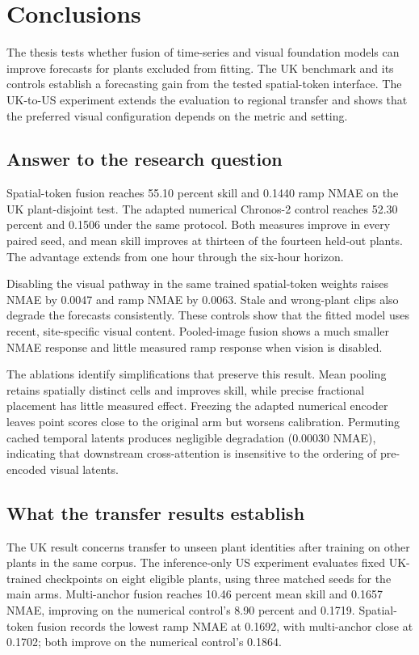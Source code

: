\chapter{Conclusions}
\label{cha:conclusions}

The thesis tests whether fusion of time-series and visual foundation models can improve forecasts for plants excluded from fitting. The UK benchmark and its controls establish a forecasting gain from the tested spatial-token interface. The UK-to-US experiment extends the evaluation to regional transfer and shows that the preferred visual configuration depends on the metric and setting.

\section{Answer to the research question}

Spatial-token fusion reaches 55.10 percent skill and 0.1440 ramp NMAE on the UK plant-disjoint test. The adapted numerical Chronos-2 control reaches 52.30 percent and 0.1506 under the same protocol. Both measures improve in every paired seed, and mean skill improves at thirteen of the fourteen held-out plants. The advantage extends from one hour through the six-hour horizon.

Disabling the visual pathway in the same trained spatial-token weights raises NMAE by 0.0047 and ramp NMAE by 0.0063. Stale and wrong-plant clips also degrade the forecasts consistently. These controls show that the fitted model uses recent, site-specific visual content. Pooled-image fusion shows a much smaller NMAE response and little measured ramp response when vision is disabled.

The ablations identify simplifications that preserve this result. Mean pooling retains spatially distinct cells and improves skill, while precise fractional placement has little measured effect. Freezing the adapted numerical encoder leaves point scores close to the original arm but worsens calibration. Permuting cached temporal latents produces negligible degradation (0.00030 NMAE), indicating that downstream cross-attention is insensitive to the ordering of pre-encoded visual latents.

\section{What the transfer results establish}

The UK result concerns transfer to unseen plant identities after training on other plants in the same corpus. The inference-only US experiment evaluates fixed UK-trained checkpoints on eight eligible plants, using three matched seeds for the main arms. Multi-anchor fusion reaches 10.46 percent mean skill and 0.1657 NMAE, improving on the numerical control's 8.90 percent and 0.1719. Spatial-token fusion records the lowest ramp NMAE at 0.1692, with multi-anchor close at 0.1702; both improve on the numerical control's 0.1864.

